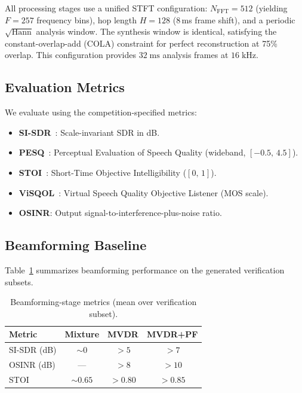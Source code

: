 \documentclass[a4paper]{article}
\begin{document}
All processing stages use a unified STFT configuration: $N_\text{FFT}=512$
(yielding $F=257$ frequency bins), hop length $H=128$ (8\,ms frame shift),
and a periodic $\sqrt{\text{Hann}}$ analysis window.  The synthesis window
is identical, satisfying the constant-overlap-add (COLA) constraint for
perfect reconstruction at 75\% overlap.  This configuration provides
$32\;\text{ms}$ analysis frames at $16\;\text{kHz}$.

\subsection{Evaluation Metrics}
\label{sec:metrics}

We evaluate using the competition-specified metrics:
\begin{itemize}\itemsep0pt
\item \textbf{SI-SDR}~\cite{leroux2019sdr}: Scale-invariant SDR in dB.
\item \textbf{PESQ}~\cite{rix2001pesq}: Perceptual Evaluation of Speech
      Quality (wideband, $[-0.5,\,4.5]$).
\item \textbf{STOI}~\cite{taal2011stoi}: Short-Time Objective
      Intelligibility ($[0,\,1]$).
\item \textbf{ViSQOL}~\cite{chinen2020visqol}: Virtual Speech Quality
      Objective Listener (MOS scale).
\item \textbf{OSINR}: Output signal-to-interference-plus-noise ratio.
\end{itemize}

\subsection{Beamforming Baseline}
\label{sec:bf_results}

Table~\ref{tab:bf_results} summarizes beamforming performance on the
generated verification subsets.

\begin{table}[t]
\centering
\caption{Beamforming-stage metrics (mean over verification subset).}
\label{tab:bf_results}
\small
\begin{tabular}{@{}lccc@{}}
\toprule
\textbf{Metric} & \textbf{Mixture} & \textbf{MVDR} & \textbf{MVDR+PF}\\
\midrule
SI-SDR (dB) & $\sim\!0$ & $>\!5$ & $>\!7$\\
OSINR (dB)  & --- & $>\!8$ & $>\!10$\\
STOI        & $\sim\!0.65$ & $>\!0.80$ & $>\!0.85$\\
\bottomrule
\end{tabular}
\end{table}
\end{document}

